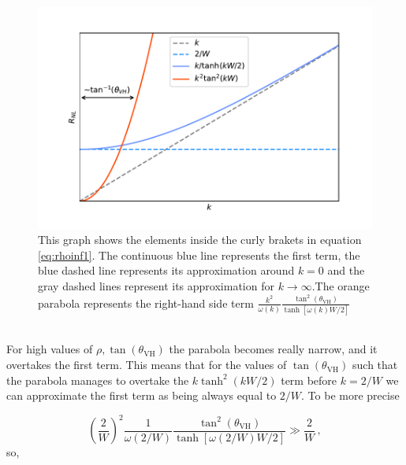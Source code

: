 \begin{figure}[h!]
    \centering
    \includegraphics[width=\linewidth]{Immagini/rnl/rho1.pdf}
    \caption{This graph shows the elements inside the curly brakets in equation \ref{eq:rhoinf1}. The continuous blue line represents the first term, the blue dashed line represents its approximation around $k=0$ and the gray dashed lines represent its approximation for $k\to \infty$.\newline The orange parabola represents the right-hand side term $\frac {k^2}{\omega(k)}\frac{\tan^2(\theta_{\textrm{VH}})}{\tanh[\omega(k)W/2]}$}
    \label{fig:rho1}
\end{figure}\\
For high values of $\rho, \tan(\theta_{\textrm{VH}})$ the parabola becomes really narrow, and it overtakes the first term. This means that for the values of $\tan(\theta_{\textrm{VH}})$ such that the parabola manages to overtake the $k\tanh^2(kW/2)$ term before $k=2/W$ we can approximate the first term as being always equal to $2/W$. To be more precise

\[
    \left(\frac 2W\right)^2\frac 1{\omega(2/W)}\frac{\tan^2(\theta_{\textrm{VH}})}{\tanh[\omega(2/W)W/2]}\gg \frac 2W\,,
\]
so,

